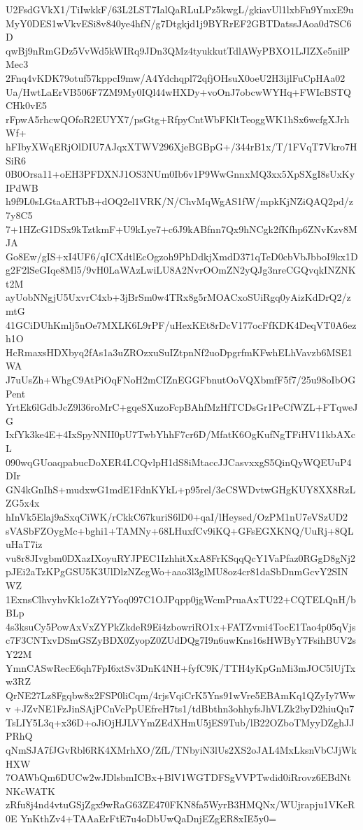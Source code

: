 U2FsdGVkX1/TiIwkkF/63L2LST7IalQaRLuLPz5kwgL/gkiavUl1lxbFn9YmxE9u
MyY0DES1wVkvESi8v840ye4hfN/g7Dtgkjd1j9BYRrEF2GBTDatssJAoa0d7SC6D
qwBj9nRmGDz5VvWd5kWIRq9JDn3QMz4tyukkutTdlAWyPBXO1LJIZXe5nilPMec3
2Fnq4vKDK79otuf57kppcI9mw/A4Ydchqpl72qfjOHsuX0oeU2H3ijlFuCpHAa02
Ua/HwtLaErVB506F7ZM9My0IQl44wHXDy+voOnJ7obcwWYHq+FWIcBSTQCHk0vE5
rFpwA5rhcwQOfoR2EUYX7/psGtg+RfpyCntWbFKltTeoggWK1hSx6wcfgXJrhWf+
hFIbyXWqERjOlDIU7AJqxXTWV296XjeBGBpG+/344rB1x/T/1FVqT7Vkro7HSiR6
0B0Orsa11+oEH3PFDXNJ1OS3NUm0Ib6v1P9WwGnnxMQ3xx5XpSXgI8sUxKyIPdWB
h9f9L0sLGtaARTbB+dOQ2el1VRK/N/ChvMqWgAS1fW/mpkKjNZiQAQ2pd/z7y8C5
7+1HZcG1DSx9kTztkmF+U9kLye7+c6J9kABfnn7Qx9hNCgk2fKfhp6ZNvKzv8MJA
Go8Ew/gIS+xI4UF6/qICXdtlEcOgzoh9PhDdkjXmdD371qTeD0cbVbJbboI9kx1D
g2F2lSeGIqe8Ml5/9vH0LaWAzLwiLU8A2NvrOOmZN2yQJg3nreCGQvqkINZNKt2M
ayUobNNgjU5UxvrC4xb+3jBrSm0w4TRx8g5rMOACxoSUiRgq0yAizKdDrQ2/zmtG
41GCiDUhKmlj5nOe7MXLK6L9rPF/uHexKEt8rDcV177ocFfKDK4DeqVT0A6ezh1O
HcRmaxsHDXbyq2fAs1a3uZROzxuSuIZtpnNf2uoDpgrfmKFwhELhVavzb6MSE1WA
J7uUsZh+WhgC9AtPiOqFNoH2mCIZnEGGFbnutOoVQXbmfF5f7/25u98oIbOGPent
YrtEk6lGdbJcZ9l36roMrC+gqeSXuzoFcpBAhfMzHfTCDsGr1PeCfWZL+FTqweJG
IxfYk3ke4E+4IxSpyNNII0pU7TwbYhhF7cr6D/MfatK6OgKufNgTFiHV11kbAXcL
090wqGUoaqpabucDoXER4LCQvlpH1dS8iMtaccJJCasvxxgS5QinQyWQEUuP4DIr
GN4kGnIhS+mudxwG1mdE1FdnKYkL+p95rel/3eCSWDvtwGHgKUY8XX8RzLZG5x4x
hInVk5Elaj9aSxqCiWK/rCkkC67kuriS6lD0+qaI/lHeysed/OzPM1nU7eVSzUD2
sVASbFZOygMc+bghi1+TAMNy+68LHuxfCv9iKQ+GFsEGXKNQ/UuRj+8QLuHaT7iz
vu8r8JIvgbm0DXazIXoyuRYJPEC1IzhhitXxA8FrKSqqQcY1VaPfaz0RGgD8gNj2
pJEi2aTzKPgGSU5K3UlDlzNZcgWo+aao3l3glMU8oz4cr81daSbDnmGcvY2SINWZ
1ExnsClhvyhvKk1oZtY7Yoq097C1OJPqpp0jgWcmPruaAxTU22+CQTELQnH/bBLp
4s3ksuCy5PowAxVxZYPkZkdeR9Ei4zbowriRO1x+FATZvmi4TocE1Tao4p05qVjs
c7F3CNTxvDSmGSZyBDX0ZyopZ0ZUdDQg7I9n6uwKns16sHWByY7FsihBUV2sY22M
YmnCASwRecE6qh7FpI6xtSv3DnK4NH+fyfC9K/TTH4yKpGnMi3mJOC5lUjTxw3RZ
QrNE27Lz8Fgqbw8x2FSP0liCqm/4rjsVqiCrK5Yns91wVre5EBAmKq1QZyIy7Wwv
+JZvNE1FzJinSAjPCnVcPpUEfreH7ts1/tdBbthn3ohhyfsJhVLZk2byD2hiuQu7
TsLIY5L3q+x36D+oJiOjHJLVYmZEdXHmU5jES9Tub/lB22OZboTMyyDZghJJPRhQ
qNmSJA7fJGvRbl6RK4XMrhXO/ZfL/TNbyiN3lUs2XS2oJAL4MxLksnVbCJjWkHXW
7OAWbQm6DUCw2wJDlsbmICBx+BlV1WGTDFSgVVPTwdid0iRrovz6EBdNtNKcWATK
zRfu8j4nd4vtuGSjZgx9wRaG63ZE470FKN8fa5WyrB3HMQNx/WUjrapju1VKeR0E
YnKthZv4+TAAaErFtE7u4oDbUwQaDnjEZgER8xIE5y0=
